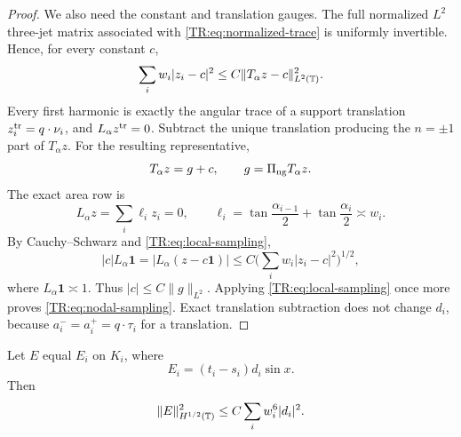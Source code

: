 \begin{proof}
We also need the constant and translation gauges.  The full normalized
$L^2$ three-jet matrix associated with \eqref{TR:eq:normalized-trace} is
uniformly invertible.  Hence, for every constant $c$,
\begin{equation}\label{TR:eq:local-sampling}
 \sum_iw_i|z_i-c|^2
 \le C\|T_\alpha z-c\|_{L^2(\mathbb T)}^2.
\end{equation}
Every first harmonic is exactly the angular trace of a support
translation $z_i^{\rm tr}=q\cdot\nu_i$, and $L_\alpha z^{\rm tr}=0$.
Subtract the unique translation producing the $n=\pm1$ part of
$T_\alpha z$.  For the resulting representative,
\begin{equation*}
 T_\alpha z=g+c,\qquad g=\Pi_{\rm ng} T_\alpha z.
\end{equation*}
The exact area row is
\begin{equation}\label{TR:eq:exact-area-row}
 L_\alpha z=\sum_i\ell_i z_i=0,\qquad
 \ell_i=\tan\frac{\alpha_{i-1}}2+
        \tan\frac{\alpha_i}2\asymp w_i.
\end{equation}
By Cauchy--Schwarz and \eqref{TR:eq:local-sampling},
\begin{equation*}
 |c|L_\alpha\mathbf1=|L_\alpha(z-c\mathbf1)|
 \le C\Big(\sum_iw_i|z_i-c|^2\Big)^{1/2},
\end{equation*}
where $L_\alpha\mathbf1\asymp1$.  Thus
$|c|\le C\|g\|_{L^2}$.  Applying
\eqref{TR:eq:local-sampling} once more proves
\eqref{TR:eq:nodal-sampling}.  Exact translation subtraction does not
change $d_i$, because $a_i^-=a_i^+=q\cdot\tau_i$ for a translation.
\end{proof}

\begin{lemma}
\label{TR:lem:zero-wall}
Let $E$ equal $E_i$ on $K_i$, where
\begin{equation}\label{TR:eq:trace-error-local}
 E_i=(t_i-s_i)d_i\sin x.
\end{equation}
Then
\begin{equation}\label{TR:eq:zero-wall-bound}
 \|E\|_{H^{1/2}(\mathbb T)}^2\le C\sum_iw_i^6|d_i|^2.
\end{equation}
\end{lemma}

